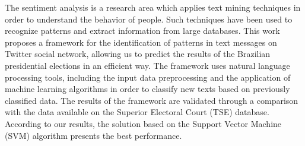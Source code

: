 The sentiment analysis is a research area which applies text mining techniques in order to understand the behavior of people.
 Such techniques have been used to recognize patterns and extract information from large databases.
  This work proposes a framework for the identification of patterns in text messages on Twitter social network, allowing us to predict the 
  results of the Brazilian presidential elections in an efficient way. The framework uses natural language processing tools, including the input 
  data preprocessing and the application of machine learning algorithms in order to classify new texts based on previously classified data. 
  The results of the framework are validated through a comparison with the data available on the Superior Electoral Court (TSE) database. 
  According to our results, the solution based on the Support Vector Machine (SVM) algorithm presents the best performance.
